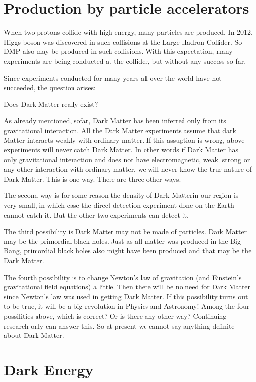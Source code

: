 \section{Production by particle accelerators}

When two protons collide with high energy, many particles are
produced. In 2012, Higgs boson was discovered in such collisions
at the Large Hadron Collider. So DMP also may be produced in such
collisions. With this expectation, many experiments are being
conducted at the collider, but without any success so far.

Since experiments conducted for many years all over the world have
not succeeded, the question arises:

Does Dark Matter really exist?

As already mentioned, sofar, Dark Matter has been inferred only
from its gravitational interaction. All the Dark Matter experiments
assume that dark Matter interacts weakly with ordinary matter. If
this assuption is wrong, above experiments will never catch Dark
Matter. In other words if Dark Matter has only gravitational
interaction and does not have electromagnetic, weak, strong
or any other interaction with ordinary matter, we will never
know the true nature of Dark Matter. This is one way. There
are three other ways.

The second way is for some reason the density of Dark Matterin our region is very small, in which case the direct detection
experiment done on the Earth cannot catch it. But the other two
experiments can detect it.

The third possibility is Dark Matter may not be made of particles.
Dark Matter may be the primordial black holes. Just as all matter
was produced in the Big Bang, primordial black holes also might
have been produced and that may be the Dark Matter.

The fourth possibility is to change Newton's law of gravitation
(and Einstein's gravitational field equations) a little. Then there
will be no need for Dark Matter since Newton's law was used in getting
Dark Matter. If this possibility turns out to be true, it will be
a big revolution in Physics and Astronomy!
Among the four possilities above, which is correct? Or is there
any other way? Continuing research only can answer this. So
at present we cannot say anything definite about Dark Matter.

\section*{Dark Energy}

